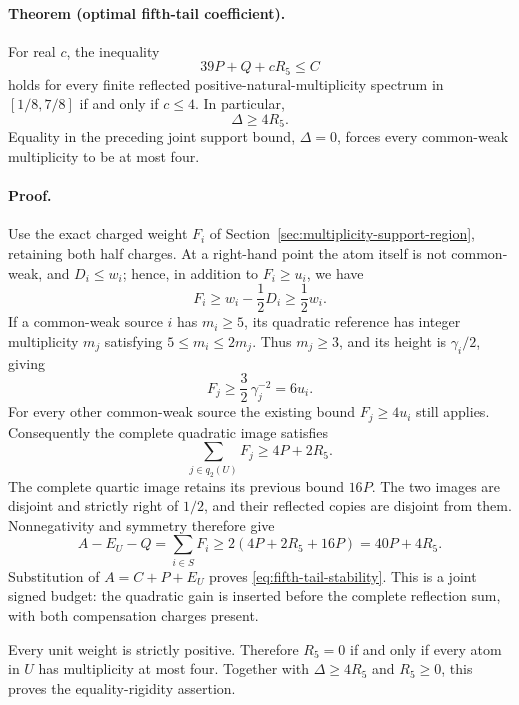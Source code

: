 \paragraph{Theorem (optimal fifth-tail coefficient).}
For real \(c\), the inequality
\[
 39P+Q+cR_5\le C
\]
holds for every finite reflected positive-natural-multiplicity spectrum
in \([1/8,7/8]\) if and only if \(c\le4\). In particular,
\begin{equation}\label{eq:fifth-tail-stability}
 \boxed{\qquad \Delta\ge4R_5.\qquad}
\end{equation}
Equality in the preceding joint support bound, \(\Delta=0\), forces
every common-weak multiplicity to be at most four.

\paragraph{Proof.}
Use the exact charged weight \(F_i\) of
Section~\ref{sec:multiplicity-support-region}, retaining both half
charges. At a right-hand point the atom itself is not common-weak, and
\(D_i\le w_i\); hence, in addition to \(F_i\ge u_i\), we have
\[
 F_i\ge w_i-\frac12D_i\ge\frac12w_i.
\]
If a common-weak source \(i\) has \(m_i\ge5\), its quadratic reference
has integer multiplicity \(m_j\) satisfying \(5\le m_i\le2m_j\).
Thus \(m_j\ge3\), and its height is \(\gamma_i/2\), giving
\[
 F_j\ge\frac32\,\gamma_j^{-2}=6u_i.
\]
For every other common-weak source the existing bound \(F_j\ge4u_i\)
still applies. Consequently the complete quadratic image satisfies
\[
 \sum_{j\in q_2(U)}F_j\ge4P+2R_5.
\]
The complete quartic image retains its previous bound \(16P\).
The two images are disjoint and strictly right of \(1/2\), and their
reflected copies are disjoint from them. Nonnegativity and symmetry
therefore give
\[
 A-E_U-Q=\sum_{i\in S}F_i
 \ge2(4P+2R_5+16P)=40P+4R_5.
\]
Substitution of \(A=C+P+E_U\) proves
\eqref{eq:fifth-tail-stability}. This is a joint signed budget:
the quadratic gain is inserted before the complete reflection sum,
with both compensation charges present.

Every unit weight is strictly positive. Therefore \(R_5=0\) if and
only if every atom in \(U\) has multiplicity at most four.
Together with \(\Delta\ge4R_5\) and \(R_5\ge0\), this proves the
equality-rigidity assertion.

